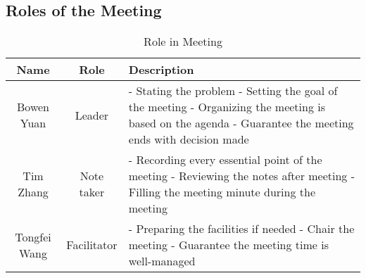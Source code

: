 \documentclass[12pt]{article}
\newcommand\tab[1][1cm]{\hspace*{#1}}
\begin{document}
\subsection{Roles of the Meeting}
\begin{table}[h!]
\centering
\begin{tabular}{|c|c|p{8cm}|}
\hline
 \textbf{Name} & \textbf{Role} & \tab \tab \textbf{Description} \\
\hline
Bowen Yuan& Leader & 
 - {\footnotesize Stating the problem}   \newline   
 - {\footnotesize Setting the goal of the meeting} \newline 
 - {\footnotesize Organizing the meeting is based on the agenda} \newline 
 - {\footnotesize Guarantee the meeting ends with  decision made} \newline 
\\
\hline
Tim Zhang & Note taker &  
 - {\footnotesize Recording every essential point of the meeting}   \newline   
 - {\footnotesize Reviewing the notes after meeting} \newline 
 - {\footnotesize Filling the meeting minute during the meeting} \newline 
\\
\hline
Tongfei Wang& Facilitator & 
 - {\footnotesize Preparing the facilities if needed}   \newline   
 - {\footnotesize Chair the meeting} \newline 
 - {\footnotesize Guarantee the meeting time is well-managed} \newline 
\\
\hline
\end{tabular}
\caption{ Role in Meeting }
\end{table}
\end{document}
